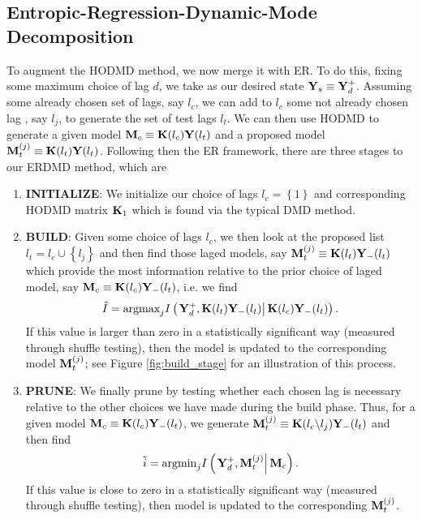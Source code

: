 \documentclass[a4paper,11pt]{article}
\begin{document}
\subsection{Entropic-Regression-Dynamic-Mode Decomposition}
To augment the HODMD method, we now merge it with ER.  To do this, fixing some maximum choice of lag $d$, we take as our desired state ${\bf Y}_{s}\equiv {\bf Y}_{d}^{+}$.  Assuming some already chosen set of lags, say $l_{c}$, we can add to $l_{c}$ some not already chosen lag , say $l_{j}$, to generate the set of test lags $l_{t}$.  We can then use HODMD to generate a given model ${\bf M}_{c}\equiv {\bf K}(l_{c}){\bf Y}(l_{t})$ and a proposed model ${\bf M}_{t}^{(j)}\equiv {\bf K}(l_{t}){\bf Y}(l_{t})$.  Following then the ER framework, there are three stages to our ERDMD method, which are 
\begin{enumerate}
\item {\bf INITIALIZE}: We initialize our choice of lags $l_{c}=\left\{1\right\}$ and corresponding HODMD matrix ${\bf K}_{1}$ which is found via the typical DMD method.    
\item {\bf BUILD}: Given some choice of lags $l_{c}$, we then look at the proposed list $l_{t}=l_{c}\cup \left\{l_{j}\right\}$ and then find those laged models, say ${\bf M}^{(j)}_{t}\equiv {\bf K}(l_{t}){\bf Y}_{-}(l_{t})$ which provide the most information relative to the prior choice of laged model, say ${\bf M}_{c}\equiv {\bf K}(l_{c}){\bf Y}_{-}(l_{t})$, i.e. we find 
\begin{equation}
\tilde{I} = \text{argmax}_{j}I\left(\left.{\bf Y}^{+}_{d},{\bf K}(l_{t}){\bf Y}_{-}(l_{t})\right|{\bf K}(l_{c}){\bf Y}_{-}(l_{t})\right).  
\label{build_eqn}
\end{equation}
If this value is larger than zero in a statistically significant way (measured through shuffle testing), then the model is updated to the corresponding model ${\bf M}^{(j)}_{t}$; see Figure \ref{fig:build_stage} for an illustration of this process.    
\item {\bf PRUNE}: We finally prune by testing whether each chosen lag is necessary relative to the other choices we have made during the build phase.  Thus, for a given model ${\bf M}_{c}\equiv {\bf K}(l_{c}){\bf Y}_{-}(l_{t})$, we generate ${\bf M}^{(j)}_{t}\equiv {\bf K}(l_{c}\backslash l_{j}){\bf Y}_{-}(l_{t})$ and then find 
\begin{equation}
\tilde{i} = \text{argmin}_{j}I\left(\left.{\bf Y}^{+}_{d},{\bf M}^{(j)}_{t}\right|{\bf M}_{c}\right).  
\label{prune_eqn}
\end{equation}
If this value is close to zero in a statistically significant way (measured through shuffle testing), then model is updated to the corresponding ${\bf M}^{(j)}_{t}$.  
\end{enumerate}
\end{document}

